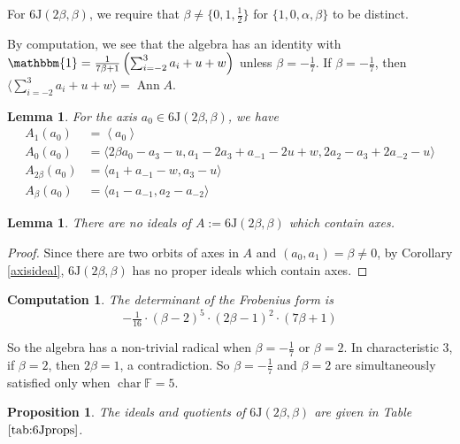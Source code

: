 \documentclass[11pt, a4paper]{article}
\theoremstyle{plain}
\newtheorem{lemma}[theorem]{Lemma}
\newtheorem{proposition}[theorem]{Proposition}
\newtheorem{computation}[theorem]{Computation}
\theoremstyle{definition}
\newcommand\al{\alpha}
\newcommand\bt{\beta}
\newcommand\la{\langle}
\newcommand\ra{\rangle}
\DeclareMathOperator{\ch}{char}
\DeclareMathOperator{\Ann}{Ann}
\newcommand\FF{\mathbb{F}}
\newcommand{\J}{\mathrm{J}}
\newcommand{\0}{\overline{0}}
\newcommand{\2}{\overline{2}}
\newcommand{\1}{\mathbbm{1}}
\begin{document}
For $6\J(2\bt, \bt)$, we require that $\bt  \neq \{0,1, \frac{1}{2}\}$ for $\{1,0,\al,\bt\}$ to be distinct.

By computation, we see that the algebra has an identity with $\1 = \tfrac{1}{7\bt+1} \left( \sum_{i=-2}^3 a_i +u+w \right)$ unless $\bt =-\tfrac{1}{7}$.  If $\bt = -\frac{1}{7}$, then $\la  \sum_{i=-2}^3 a_i +u+w \ra = \Ann A$.

\begin{lemma}
	For the axis $a_0 \in 6\J(2\bt,\bt)$, we have
	\begin{align*}
		A_1(a_0) &= \left\la a_0 \right\ra  \\
		A_0(a_0) &= \la 2\bt a_0 - a_3 - u, a_1 - 2a_3 +a_{-1} -2u +  w, 2 a_2 - a_3 + 2 a_{-2} - u \ra\\
		A_{2\bt}(a_0) &= \la a_1 + a_{-1} - w, a_3 - u\ra \\
		A_{\bt}(a_0) &= \la a_1 - a_{-1}, a_2-a_{-2} \ra 
	\end{align*}
\end{lemma}

\begin{lemma}
	There are no ideals of $A := 6\J(2\bt, \bt)$ which contain axes.
\end{lemma}
\begin{proof}
Since there are two orbits of axes in $A$ and $(a_0, a_1) = \bt \neq 0$, by Corollary \ref{axisideal}, $6\J(2\bt,\bt)$ has no proper ideals which contain axes.
\end{proof}


\begin{computation}
	The determinant of the Frobenius form is 
	\[
	-\tfrac{1}{16} \cdot (\bt - 2)^5 \cdot (2\bt - 1)^2 \cdot \left(7\bt + 1\right)
	\]
\end{computation}

So the algebra has a non-trivial radical when  $\bt = -\frac{1}{7}$ or $\bt = 2$.  In characteristic $3$, if $\bt = 2$, then $2\bt = 1$, a contradiction.  So $\bt = -\frac{1}{7}$ and $\bt = 2$ are simultaneously satisfied only when $\ch \FF = 5$.



\begin{proposition}
	The ideals and quotients of $6\J(2\bt, \bt)$ are given in Table $\ref{tab:6Jprops}$.
\end{proposition}
\end{document}
